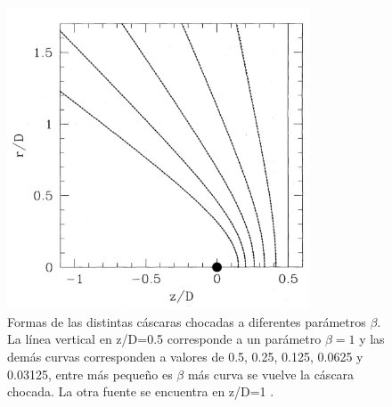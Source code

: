 \documentclass{book}
\begin{document}
\begin{figure}[htb]
    \centering    \includegraphics[width=0.8\textwidth]{images Chapter 2/C2_Canto2.jpg}
    \caption{Formas de las distintas cáscaras chocadas a diferentes
      parámetros $\beta$. La línea vertical en z/D=0.5 corresponde a un
      parámetro $\beta=1$ y las demás curvas corresponden a valores de
      0.5, 0.25, 0.125, 0.0625 y 0.03125, entre más pequeño es $\beta$ más
      curva se vuelve la cáscara chocada. La otra fuente se encuentra
      en z/D=1 \citep{Canto:1996}.}
    \label{fig:Canto2}
\end{figure}

\end{document}
